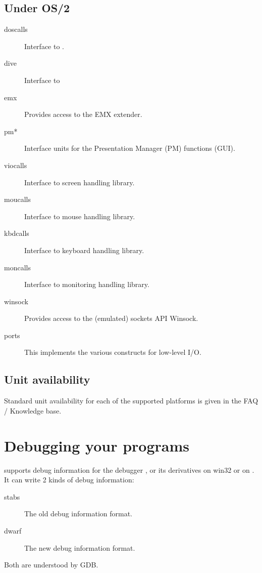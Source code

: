 \section{Under OS/2}
\begin{description}
\item[doscalls] Interface to .
\item[dive] Interface to 
\item[emx] Provides access to the EMX extender.
\item[pm*] Interface units for the Presentation Manager (PM) functions (GUI).
\item[viocalls] Interface to  screen handling library.
\item[moucalls] Interface to  mouse handling library.
\item[kbdcalls] Interface to  keyboard handling library.
\item[moncalls] Interface to  monitoring handling library.
\item[winsock] Provides access to the (emulated) \windows sockets API Winsock.
\item[ports] This implements the various  constructs for low-level
I/O.
\end{description}

\section{Unit availability}

Standard unit availability for each of the supported platforms 
is given in the FAQ / Knowledge base. 


\chapter{Debugging your programs}

\fpc supports debug information for the \gnu debugger , or
its derivatives  on win32 or  on \linux.
It can write 2 kinds of debug information:
\begin{description}
\item[stabs] The old debug information format.
\item[dwarf] The new debug information format.
\end{description}
Both are understood by GDB.


